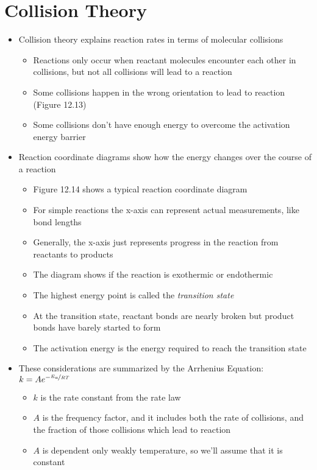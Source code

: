 \documentclass[12pt, openany, letterpaper]{memoir}
\begin{document}
\section{Collision Theory}
\begin{itemize}
	\item Collision theory explains reaction rates in terms of molecular collisions
	\begin{itemize}
		\item Reactions only occur when reactant molecules encounter each other in collisions, but not all collisions will lead to a reaction
		\item Some collisions happen in the wrong orientation to lead to reaction (Figure 12.13)
		\item Some collisions don't have enough energy to overcome the activation energy barrier
  \end{itemize}
	\item Reaction coordinate diagrams show how the energy changes over the course of a reaction
	\begin{itemize}
		\item Figure 12.14 shows a typical reaction coordinate diagram
		\item For simple reactions the x-axis can represent actual measurements, like bond lengths
		\item Generally, the x-axis just represents progress in the reaction from reactants to products
		\item The diagram shows if the reaction is exothermic or endothermic
		\item The highest energy point is called the \emph{transition state}
		\item At the transition state, reactant bonds are nearly broken but product bonds have barely started to form
		\item The activation energy is the energy required to reach the transition state
	\end{itemize}
  \item These considerations are summarized by the Arrhenius Equation: $k=Ae^{-\nicefrac{E_a}{RT}}$
  \begin{itemize}
		\item $k$ is the rate constant from the rate law
		\item $A$ is the frequency factor, and it includes both the rate of collisions, and the fraction of those collisions which lead to reaction
		\item $A$ is dependent only weakly temperature, so we'll assume that it is constant

\end{itemize}
\end{itemize}
\end{document}
